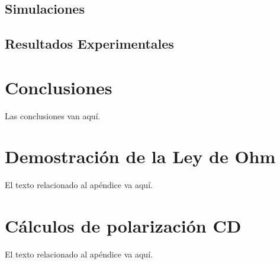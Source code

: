 \documentclass[journal]{IEEEtran}
\begin{document}
\subsection{Simulaciones}
\subsection{Resultados Experimentales}


\section{Conclusiones}
Las conclusiones van aquí.

\appendices
\section{Demostración de la Ley de Ohm}
El texto relacionado al apéndice va aquí.

\section{Cálculos de polarización CD}
El texto relacionado al apéndice va aquí.



\section{}
\printbibliography
\end{document}
